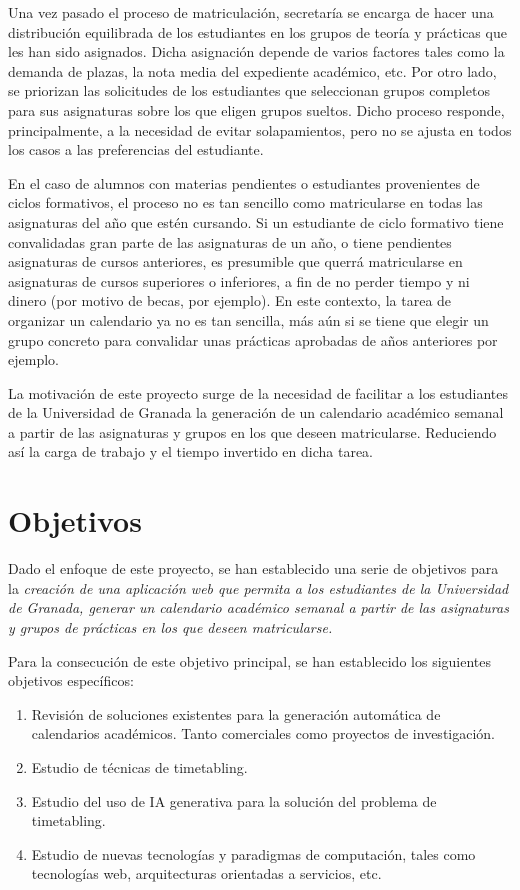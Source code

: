 Una vez pasado el proceso de matriculación, secretaría se encarga de hacer una distribución equilibrada de los estudiantes en los grupos de teoría y prácticas que les han sido asignados. Dicha asignación depende de varios factores tales como la demanda de plazas, la nota media del expediente académico, etc. Por otro lado, se priorizan las solicitudes de los estudiantes que seleccionan grupos completos para sus asignaturas sobre los que eligen grupos sueltos. Dicho proceso responde, principalmente, a la necesidad de evitar solapamientos, pero no se ajusta en todos los casos a las preferencias del estudiante.\newline

En el caso de alumnos con materias pendientes o estudiantes provenientes de ciclos formativos, el proceso no es tan sencillo como matricularse en todas las asignaturas del año que estén cursando.
Si un estudiante de ciclo formativo tiene convalidadas gran parte de las asignaturas de un año, o tiene pendientes asignaturas de cursos anteriores, es presumible que querrá matricularse en asignaturas de cursos superiores o inferiores, a fin de no perder tiempo y ni dinero (por motivo de becas, por ejemplo). En este contexto, la tarea de organizar un calendario ya no es tan sencilla, más aún si se tiene que elegir un grupo concreto para convalidar unas prácticas aprobadas de años anteriores por ejemplo.\newline

La motivación de este proyecto surge de la necesidad de facilitar a los estudiantes de la Universidad de Granada la generación de un calendario académico semanal a partir de las asignaturas y grupos en los que deseen matricularse. Reduciendo así la carga de trabajo y el tiempo invertido en dicha tarea.


\section{Objetivos}
Dado el enfoque de este proyecto, se han establecido una serie de objetivos para la \textit{creación de una aplicación web que permita a los estudiantes de la Universidad de Granada, generar un calendario académico semanal a partir de las asignaturas y grupos de prácticas en los que deseen matricularse.}\newline

Para la consecución de este objetivo principal, se han establecido los siguientes objetivos específicos:
\begin{enumerate}
    \item Revisión de soluciones existentes para la generación automática de calendarios académicos. Tanto comerciales como proyectos de investigación.
    \item Estudio de técnicas de timetabling.
    \item Estudio del uso de IA generativa para la solución del problema de timetabling.
    \item Estudio de nuevas tecnologías y paradigmas de computación, tales como tecnologías web, arquitecturas orientadas a servicios, etc.
\end{enumerate}